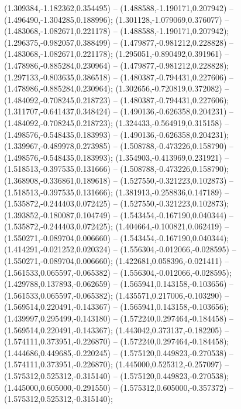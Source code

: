  (1.309384,-1.182362,0.354495) -- (1.488588,-1.190171,0.207942) -- (1.496490,-1.304285,0.188996);
 (1.301128,-1.079069,0.376077) -- (1.483068,-1.082671,0.221178) -- (1.488588,-1.190171,0.207942);
 (1.296375,-0.982057,0.388499) -- (1.479877,-0.981212,0.228828) -- (1.483068,-1.082671,0.221178);
 (1.295051,-0.890492,0.391961) -- (1.478986,-0.885284,0.230964) -- (1.479877,-0.981212,0.228828);
 (1.297133,-0.803635,0.386518) -- (1.480387,-0.794431,0.227606) -- (1.478986,-0.885284,0.230964);
 (1.302656,-0.720819,0.372082) -- (1.484092,-0.708245,0.218723) -- (1.480387,-0.794431,0.227606);
 (1.311707,-0.641437,0.348424) -- (1.490136,-0.626358,0.204231) -- (1.484092,-0.708245,0.218723);
 (1.324433,-0.564919,0.315158) -- (1.498576,-0.548435,0.183993) -- (1.490136,-0.626358,0.204231);
 (1.339967,-0.489978,0.273985) -- (1.508788,-0.473226,0.158790) -- (1.498576,-0.548435,0.183993);
 (1.354903,-0.413969,0.231921) -- (1.518513,-0.397535,0.131666) -- (1.508788,-0.473226,0.158790);
 (1.368908,-0.336861,0.189618) -- (1.527550,-0.321223,0.102873) -- (1.518513,-0.397535,0.131666);
 (1.381913,-0.258836,0.147189) -- (1.535872,-0.244403,0.072425) -- (1.527550,-0.321223,0.102873);
 (1.393852,-0.180087,0.104749) -- (1.543454,-0.167190,0.040344) -- (1.535872,-0.244403,0.072425);
 (1.404664,-0.100821,0.062419) -- (1.550271,-0.089704,0.006660) -- (1.543454,-0.167190,0.040344);
 (1.414291,-0.021252,0.020324) -- (1.556304,-0.012066,-0.028595) -- (1.550271,-0.089704,0.006660);
 (1.422681,0.058396,-0.021411) -- (1.561533,0.065597,-0.065382) -- (1.556304,-0.012066,-0.028595);
 (1.429788,0.137893,-0.062659) -- (1.565941,0.143158,-0.103656) -- (1.561533,0.065597,-0.065382);
 (1.435571,0.217006,-0.103290) -- (1.569514,0.220491,-0.143367) -- (1.565941,0.143158,-0.103656);
 (1.439997,0.295499,-0.143180) -- (1.572240,0.297464,-0.184458) -- (1.569514,0.220491,-0.143367);
 (1.443042,0.373137,-0.182205) -- (1.574111,0.373951,-0.226870) -- (1.572240,0.297464,-0.184458);
 (1.444686,0.449685,-0.220245) -- (1.575120,0.449823,-0.270538) -- (1.574111,0.373951,-0.226870);
 (1.445000,0.525312,-0.257097) -- (1.575312,0.525312,-0.315140) -- (1.575120,0.449823,-0.270538);
 (1.445000,0.605000,-0.291550) -- (1.575312,0.605000,-0.357372) -- (1.575312,0.525312,-0.315140);

